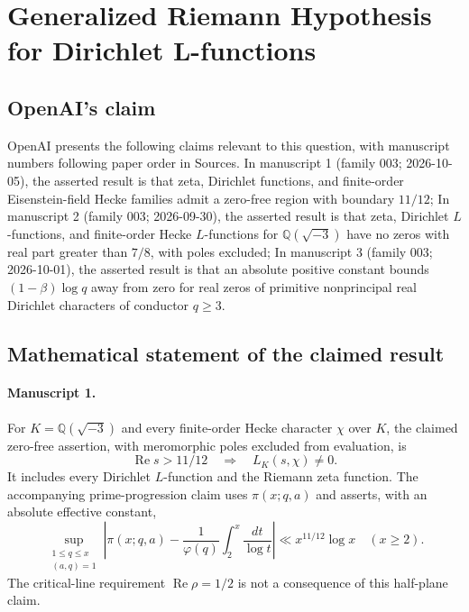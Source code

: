 \documentclass[11pt]{article}
\begin{document}
\section*{Generalized Riemann Hypothesis for Dirichlet L-functions}

\subsection{OpenAI's claim}
OpenAI presents the following claims relevant to this question, with manuscript numbers following paper order in Sources. In manuscript 1 (family 003; 2026-10-05), the asserted result is that zeta, Dirichlet functions, and finite-order Eisenstein-field Hecke families admit a zero-free region with boundary $11/12$; In manuscript 2 (family 003; 2026-09-30), the asserted result is that zeta, Dirichlet $L$-functions, and finite-order Hecke $L$-functions for $\mathbb Q(\sqrt{-3})$ have no zeros with real part greater than $7/8$, with poles excluded; In manuscript 3 (family 003; 2026-10-01), the asserted result is that an absolute positive constant bounds $(1-\beta)\log q$ away from zero for real zeros of primitive nonprincipal real Dirichlet characters of conductor $q\ge3$.

\subsection{Mathematical statement of the claimed result}
\paragraph{Manuscript 1.}
For $K=\mathbb Q(\sqrt{-3})$ and every finite-order Hecke character $\chi$ over $K$, the claimed zero-free assertion, with meromorphic poles excluded from evaluation, is
\[
 \operatorname{Re}s>11/12\quad\Longrightarrow\quad L_K(s,\chi)\ne0.
\]
It includes every Dirichlet $L$-function and the Riemann zeta function. The accompanying prime-progression claim uses $\pi(x;q,a)$ and asserts, with an absolute effective constant,
\[
 \sup_{\substack{1\le q\le x\\(a,q)=1}}
 \left|\pi(x;q,a)-\frac1{\varphi(q)}\int_2^x\frac{dt}{\log t}\right|
 \ll x^{11/12}\log x\quad(x\ge2).
\]
The critical-line requirement $\operatorname{Re}\rho=1/2$ is not a consequence of this half-plane claim.
\end{document}
